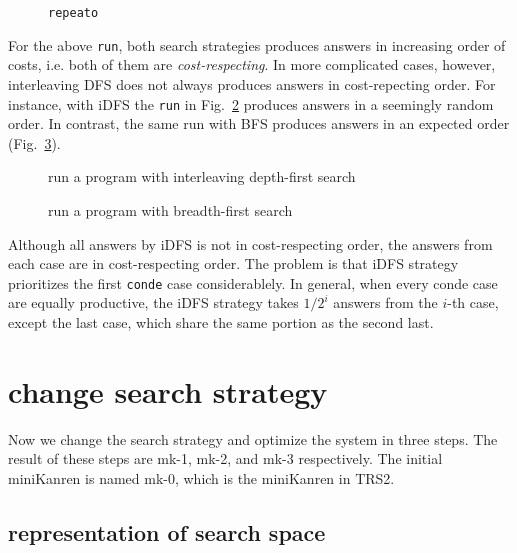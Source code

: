 \documentclass[format=acmlarge, review=true, authordraft=true]{acmart}
\begin{document}
\begin{figure}
  
  
  \caption{\texttt{repeato}}
  \label{def-repeato}
\end{figure}


For the above \texttt{run}, both search strategies produces answers in increasing order of costs, i.e. both of them are \emph{cost-respecting}. In more complicated cases, however, interleaving DFS does not always produces answers in cost-repecting order. For instance, with iDFS the \texttt{run} in Fig.~\ref{conde-repeato-iDFS} produces answers in a seemingly random order. In contrast, the same run with BFS produces answers in an expected order (Fig.~\ref{conde-repeato-BFS}).

\begin{figure}
	
	\caption{run a program with interleaving depth-first search}
	\label{conde-repeato-iDFS}
\end{figure}

\begin{figure}
	
	\caption{run a program with breadth-first search}
	\label{conde-repeato-BFS}
\end{figure}

Although all answers by iDFS is not in cost-respecting order, the answers from each case are in cost-respecting order. The problem is that iDFS strategy prioritizes the first \texttt{conde} case considerablely. In general, when every conde case are equally productive, the iDFS strategy takes $1/2^{i}$ answers from the $i$-th case, except the last case, which share the same portion as the second last.




\section{change search strategy}

Now we change the search strategy and optimize the system in three steps. The result of these steps are mk-1, mk-2, and mk-3 respectively. The initial miniKanren is named mk-0, which is the miniKanren in TRS2.

\subsection{representation of search space}
\end{document}
